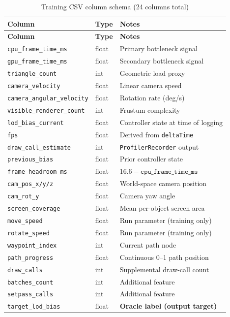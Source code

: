 \documentclass[12pt, a4paper]{article}
\begin{document}
\begin{longtable}{l l p{7cm}}
\caption{Training CSV column schema (24 columns total)}\label{tab:csv_schema}\\
\toprule
\textbf{Column} & \textbf{Type} & \textbf{Notes}\\
\midrule
\endfirsthead
\toprule
\textbf{Column} & \textbf{Type} & \textbf{Notes}\\
\midrule
\endhead
\bottomrule
\endfoot
\texttt{cpu\_frame\_time\_ms} & float & Primary bottleneck signal\\
\texttt{gpu\_frame\_time\_ms} & float & Secondary bottleneck signal\\
\texttt{triangle\_count} & int & Geometric load proxy\\
\texttt{camera\_velocity} & float & Linear camera speed\\
\texttt{camera\_angular\_velocity} & float & Rotation rate (deg/s)\\
\texttt{visible\_renderer\_count} & int & Frustum complexity\\
\texttt{lod\_bias\_current} & float & Controller state at time of logging\\
\texttt{fps} & float & Derived from \texttt{deltaTime}\\
\texttt{draw\_call\_estimate} & int & \texttt{ProfilerRecorder} output\\
\texttt{previous\_bias} & float & Prior controller state\\
\texttt{frame\_headroom\_ms} & float & $16.6 - \texttt{cpu\_frame\_time\_ms}$\\
\texttt{cam\_pos\_x/y/z} & float & World-space camera position\\
\texttt{cam\_rot\_y} & float & Camera yaw angle\\
\texttt{screen\_coverage} & float & Mean per-object screen area\\
\texttt{move\_speed} & float & Run parameter (training only)\\
\texttt{rotate\_speed} & float & Run parameter (training only)\\
\texttt{waypoint\_index} & int & Current path node\\
\texttt{path\_progress} & float & Continuous 0–1 path position\\
\texttt{draw\_calls} & int & Supplemental draw-call count\\
\texttt{batches\_count} & int & Additional feature\\
\texttt{setpass\_calls} & int & Additional feature\\
\texttt{target\_lod\_bias} & float & \textbf{Oracle label (output target)}\\
\end{longtable}
\end{document}
